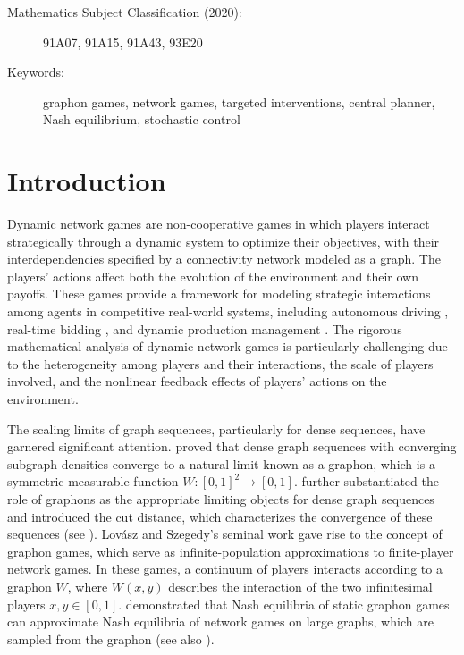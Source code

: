 \documentclass[11pt]{article}
\numberwithin{equation}{section}
\begin{document}
\begin{description}
\item[Mathematics Subject Classification (2020):] 	91A07, 91A15, 91A43, 93E20 
\item[Keywords:] graphon games, network games, targeted interventions, central planner, Nash equilibrium, stochastic control
\end{description}


\section{Introduction}

Dynamic network games are  non-cooperative games in which players interact strategically through a dynamic system to optimize their objectives,  with their interdependencies specified by a connectivity network modeled as a graph. The players’ actions affect both the evolution of the environment and their own payoffs. These games provide a framework for modeling strategic interactions among agents in competitive real-world systems, including autonomous driving \cite{hang2020human},  real-time bidding \cite{sayedi2018real}, and dynamic production management \cite{leng2005game}. The rigorous mathematical analysis of   dynamic network games is particularly challenging due to the heterogeneity among players and their interactions, the scale of players involved, and the nonlinear feedback effects of players' actions on the environment.

The scaling limits of graph sequences, particularly for dense sequences, have garnered significant attention. \citet{lovasz2006limits} proved that dense graph sequences with converging subgraph densities converge to a natural limit known as a graphon, which is a symmetric measurable function $W:[0,1]^2\to [0,1]$. \citet{borgs2008convergent,borgs2012convergent} further substantiated the role of graphons as the appropriate limiting objects for dense graph sequences and introduced the cut distance, which characterizes the convergence of these sequences (see \citet{lovasz2012large}).  Lovász and Szegedy's seminal work gave rise to the concept of graphon games, which serve as infinite-population approximations to finite-player network games. In these games, a continuum of players interacts according to a graphon $W$, where $W(x,y)$ describes the interaction of the two infinitesimal players $x,y\in [0,1]$. \citet{parise2023graphon} demonstrated that Nash equilibria of static graphon games can approximate Nash equilibria of network games on large graphs, which are sampled from the graphon (see also \cite{carmona2022stochastic, parise2021analysis}). 
\end{document}
